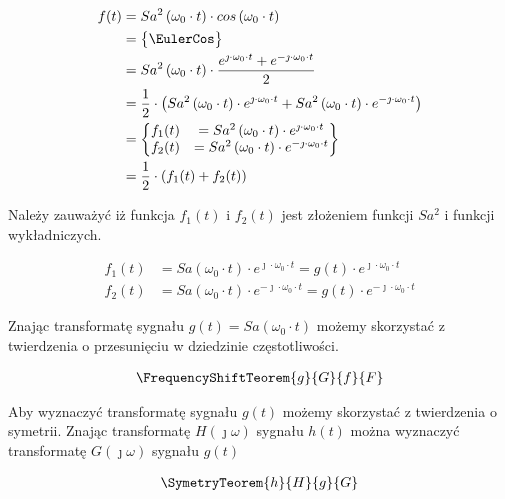 \begin{task}
\begin{align*}
f(t) &= Sa^2\left(\omega_0 \cdot t\right) \cdot cos\left(\omega_0 \cdot t\right)\\
&=\begin{Bmatrix}
\EulerCos
\end{Bmatrix}\\
&= Sa^2\left(\omega_0 \cdot t\right) \cdot \frac{e^{\jmath \cdot \omega_0 \cdot t} + e^{-\jmath \cdot \omega_0 \cdot t}}{2}\\
&= \frac{1}{2} \cdot \left( Sa^2\left(\omega_0 \cdot t\right) \cdot e^{\jmath \cdot \omega_0 \cdot t} + Sa^2\left(\omega_0 \cdot t\right) \cdot e^{-\jmath \cdot \omega_0 \cdot t} \right)\\
&=\begin{Bmatrix}
f_1(t) &= Sa^2\left(\omega_0 \cdot t\right) \cdot e^{\jmath \cdot \omega_0 \cdot t} \\
f_2(t) &= Sa^2\left(\omega_0 \cdot t\right) \cdot e^{-\jmath \cdot \omega_0 \cdot t}
\end{Bmatrix}\\
&=\frac{1}{2} \cdot \left(f_1(t) + f_2(t) \right)\\
\end{align*}

Należy zauważyć iż funkcja $f_1(t)$ i $f_2(t)$ jest złożeniem funkcji $Sa^2$ i funkcji wykładniczych.

\begin{align*}
f_1(t) &= Sa\left(\omega_0 \cdot t\right) \cdot e^{\jmath \cdot \omega_0 \cdot t} = g(t)\cdot e^{\jmath \cdot \omega_0 \cdot t}\\
f_2(t) &= Sa\left(\omega_0 \cdot t\right) \cdot e^{-\jmath \cdot \omega_0 \cdot t} = g(t) \cdot e^{-\jmath \cdot \omega_0 \cdot t}
\end{align*}

Znając transformatę sygnału $g(t) = Sa\left(\omega_0 \cdot t\right)$ możemy skorzystać z twierdzenia o przesunięciu w dziedzinie częstotliwości. 

\begin{align*}
\FrequencyShiftTeorem{g}{G}{f}{F}
\end{align*}

Aby wyznaczyć transformatę sygnału $g(t)$ możemy skorzystać z twierdzenia o symetrii. Znając transformatę $H(\jmath \omega)$ sygnału $h(t)$ można wyznaczyć transformatę $G(\jmath \omega)$ sygnału $g(t)$

\begin{align*}
\SymetryTeorem{h}{H}{g}{G}
\end{align*}


\end{task}
